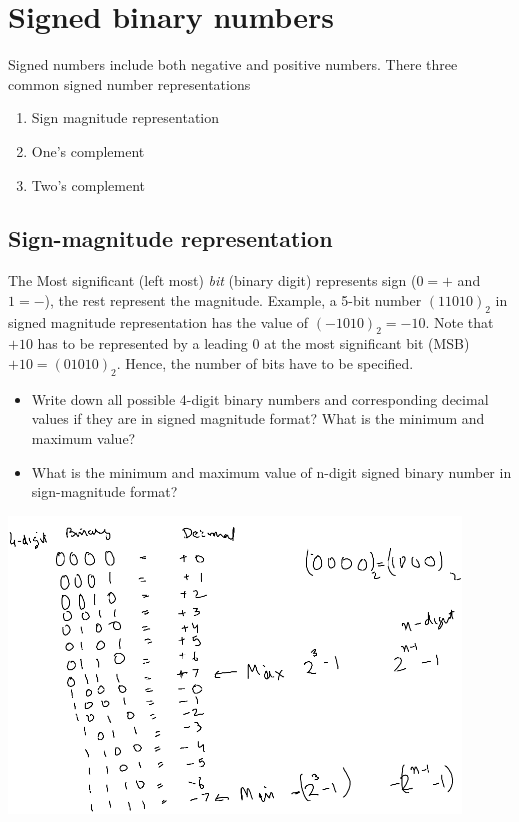 \maketitle
\section{Signed binary numbers}

Signed numbers include both negative and positive numbers. There three common
signed number representations

\begin{enumerate}
\item Sign magnitude representation
\item One's complement
\item Two's complement
\end{enumerate}
  
\subsection{Sign-magnitude representation}
The Most significant (left most) \emph{bit} (binary digit) represents sign ($0 =
+$ and $1 = -$), the rest represent the magnitude. Example, a 5-bit number
$(11010)_2$ in signed magnitude representation has the value of $(-1010)_2 =
-10$. Note that $+10$ has to be represented by a leading $0$ at the most
significant bit (MSB) $+10 = (01010)_2$. Hence, the number of bits have to be specified.

\begin{prob}
  \begin{itemize}
\item Write down all possible 4-digit binary numbers and corresponding decimal
  values if they are in signed magnitude format? What is the minimum and maximum value?
  \item What is the minimum and maximum value of n-digit signed binary number in
    sign-magnitude format?
\end{itemize}
\end{prob}

\includegraphics[width=12cm]{sign-magnitude-numbers.pdf}


